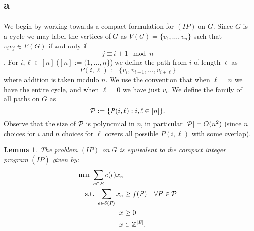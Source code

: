 \documentclass[letterpaper,12pt,oneside,onecolumn]{article}
\newtheorem{lemma}[fact]{Lemma}
\begin{document}
\subsection*{a}
\paragraph{}
We begin by working towards a compact formulation for $(IP)$ on $G$. Since $G$ is a cycle we may label the vertices of $G$ as $V(G) = \{v_1,\dots, v_n\}$ such that $v_iv_j \in E(G)$ if and only if $$j \equiv i\pm1\mod n$$. For $i, \ell \in [n]$ ($[n] := \{1,\dots, n\}$) we define the path from $i$ of length $\ell$ as 
$$P(i, \ell) := \{v_i, v_{i+1}, \dots, v_{i + \ell} \}$$
where addition is taken modulo $n$. We use the convention that when $\ell = n$ we have the entire cycle, and when $\ell = 0$ we have just $v_i$. We define the family of all paths on $G$ as
$$\mathcal{P} := \{P(i,\ell) : i, \ell \in [n]\}.$$
Observe that the size of $\mathcal{P}$ is polynomial in $n$, in particular $|\mathcal{P}| = O(n^2)$ (since $n$ choices for $i$ and $n$ choices for $\ell$ covers all possible $P(i,\ell)$ with some overlap).
\begin{lemma}\label{lemma:compact}
The problem $(IP)$ on $G$ is equivalent to the compact integer program $(\overline{IP})$ given by:
\begin{align*}
\min\ \sum_{e\in E} c(e) x_e&\\
\text{s.t.}\  \sum_{e\in\delta(P)} x_e &\geq f(P) &\forall P \in \mathcal{P} \\
x&\geq 0 \\
x&\in \mathbb{Z}^{|E|}.
\end{align*}
\end{lemma}
\end{document}

